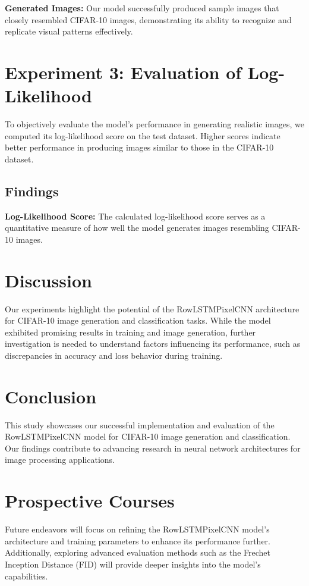 \documentclass{article}
\begin{document}
\textbf{Generated Images:} Our model successfully produced sample images that closely resembled CIFAR-10 images, demonstrating its ability to recognize and replicate visual patterns effectively.

\section{Experiment 3: Evaluation of Log-Likelihood}

To objectively evaluate the model's performance in generating realistic images, we computed its log-likelihood score on the test dataset. Higher scores indicate better performance in producing images similar to those in the CIFAR-10 dataset.

\subsection{Findings}

\textbf{Log-Likelihood Score:} The calculated log-likelihood score serves as a quantitative measure of how well the model generates images resembling CIFAR-10 images.

\section{Discussion}

Our experiments highlight the potential of the RowLSTMPixelCNN architecture for CIFAR-10 image generation and classification tasks. While the model exhibited promising results in training and image generation, further investigation is needed to understand factors influencing its performance, such as discrepancies in accuracy and loss behavior during training.

\section{Conclusion}

This study showcases our successful implementation and evaluation of the RowLSTMPixelCNN model for CIFAR-10 image generation and classification. Our findings contribute to advancing research in neural network architectures for image processing applications.

\section{Prospective Courses}

Future endeavors will focus on refining the RowLSTMPixelCNN model's architecture and training parameters to enhance its performance further. Additionally, exploring advanced evaluation methods such as the Frechet Inception Distance (FID) will provide deeper insights into the model's capabilities.
\end{document}
